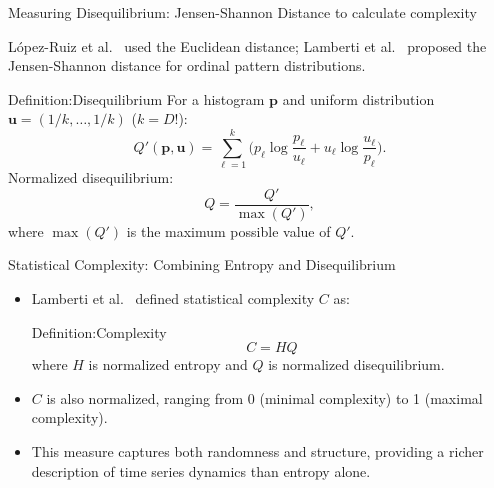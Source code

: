 \documentclass{beamer}
\begin{document}


\begin{frame}{Measuring Disequilibrium: Jensen-Shannon Distance to calculate complexity}
	
	López-Ruiz et al.~\cite{lopez1995statistical} used the \alert{Euclidean distance}; Lamberti et al.~\cite{lamberti2004intensive} proposed the \alert{Jensen-Shannon distance} for ordinal pattern distributions.
	\begin{block}{Definition:Disequilibrium}
		For a histogram $\mathbf{p}$ and uniform distribution $\mathbf{u}=(1/k, \ldots, 1/k)$ ($k=D!$):
		\[
		Q'(\mathbf{p},\mathbf{u}) = \sum_{\ell=1}^k \Big( p_\ell \log\frac{p_\ell}{u_\ell} + u_\ell \log\frac{u_\ell}{p_\ell} \Big).
		\]
		Normalized disequilibrium:
		\[
		Q = \frac{Q'}{\max(Q')},
		\]
		where $\max(Q')$ is the maximum possible value of $Q'$.
	\end{block}
\end{frame}

\begin{frame}{Statistical Complexity: Combining Entropy and Disequilibrium}
	\begin{itemize}
		\item Lamberti et al.~\cite{lamberti2004intensive} defined \alert{statistical complexity} $C$ as:
		\begin{block}{Definition:Complexity}
			\[
			C = H Q
			\]
			where $H$ is normalized entropy and $Q$ is normalized disequilibrium.
		\end{block}
		\item $C$ is also normalized, ranging from 0 (minimal complexity) to 1 (maximal complexity).
		\item This measure captures both randomness and structure, providing a richer description of time series dynamics than entropy alone.
	\end{itemize}
\end{frame}
\end{document}
